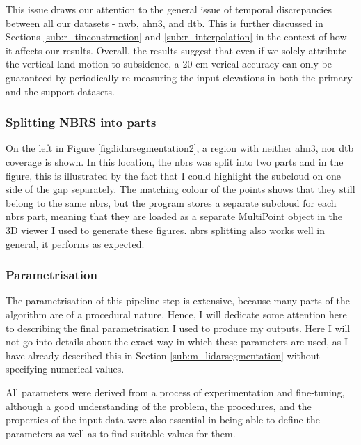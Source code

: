 This issue draws our attention to the general issue of temporal discrepancies between all our datasets - \ac{nwb}, \ac{ahn3}, and \ac{dtb}. This is further discussed in Sections \ref{sub:r_tinconstruction} and \ref{sub:r_interpolation} in the context of how it affects our results. Overall, the results suggest that even if we solely attribute the vertical land motion to subsidence, a 20 cm verical accuracy can only be guaranteed by periodically re-measuring the input elevations in both the primary and the support datasets.

\subsubsection{Splitting NBRS into parts}

On the left in Figure \ref{fig:lidarsegmentation2}, a region with neither \ac{ahn3}, nor \ac{dtb} coverage is shown. In this location, the \ac{nbrs} was split into two parts and in the figure, this is illustrated by the fact that I could highlight the subcloud on one side of the gap separately. The matching colour of the points shows that they still belong to the same \ac{nbrs}, but the program stores a separate subcloud for each \ac{nbrs} part, meaning that they are loaded as a separate MultiPoint object in the 3D viewer I used to generate these figures. \ac{nbrs} splitting also works well in general, it performs as expected.

\subsubsection{Parametrisation}

The parametrisation of this pipeline step is extensive, because many parts of the algorithm are of a procedural nature. Hence, I will dedicate some attention here to describing the final parametrisation I used to produce my outputs. Here I will not go into details about the exact way in which these parameters are used, as I have already described this in Section \ref{sub:m_lidarsegmentation} without specifying numerical values.

All parameters were derived from a process of experimentation and fine-tuning, although a good understanding of the problem, the procedures, and the properties of the input data were also essential in being able to define the parameters as well as to find suitable values for them.

